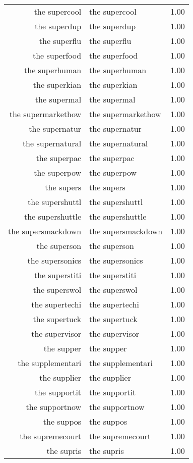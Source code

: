 \begin{table}[ht]
\begin{tabular}{rlr}
  the supercool & the supercool & 1.00 \\ 
  the superdup & the superdup & 1.00 \\ 
  the superflu & the superflu & 1.00 \\ 
  the superfood & the superfood & 1.00 \\ 
  the superhuman & the superhuman & 1.00 \\ 
  the superkian & the superkian & 1.00 \\ 
  the supermal & the supermal & 1.00 \\ 
  the supermarkethow & the supermarkethow & 1.00 \\ 
  the supernatur & the supernatur & 1.00 \\ 
  the supernatural & the supernatural & 1.00 \\ 
  the superpac & the superpac & 1.00 \\ 
  the superpow & the superpow & 1.00 \\ 
  the supers & the supers & 1.00 \\ 
  the supershuttl & the supershuttl & 1.00 \\ 
  the supershuttle & the supershuttle & 1.00 \\ 
  the supersmackdown & the supersmackdown & 1.00 \\ 
  the superson & the superson & 1.00 \\ 
  the supersonics & the supersonics & 1.00 \\ 
  the superstiti & the superstiti & 1.00 \\ 
  the superswol & the superswol & 1.00 \\ 
  the supertechi & the supertechi & 1.00 \\ 
  the supertuck & the supertuck & 1.00 \\ 
  the supervisor & the supervisor & 1.00 \\ 
  the supper & the supper & 1.00 \\ 
  the supplementari & the supplementari & 1.00 \\ 
  the supplier & the supplier & 1.00 \\ 
  the supportit & the supportit & 1.00 \\ 
  the supportnow & the supportnow & 1.00 \\ 
  the suppos & the suppos & 1.00 \\ 
  the supremecourt & the supremecourt & 1.00 \\ 
  the supris & the supris & 1.00 \\ 

\end{tabular}
\end{table}
